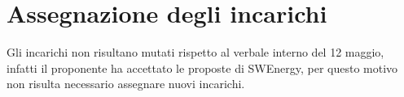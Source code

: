 \section{Assegnazione degli incarichi}

Gli incarichi non risultano mutati rispetto al verbale interno del 12 maggio,
infatti il proponente ha accettato le proposte di SWEnergy, per questo motivo
non risulta necessario assegnare nuovi incarichi.
